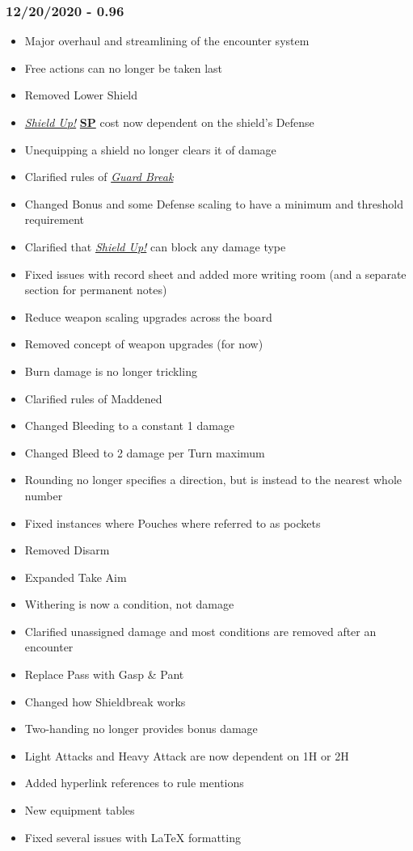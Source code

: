 \documentclass[12pt]{article}
\newcommand{\refto}[1]{\hyperlink{#1}{\textbf{#1}}}
\newcommand{\reftoit}[1]{\hyperlink{#1}{\emph{#1}}}
\begin{document}
\begin{multicols*}{2}
\subsubsection*{12/20/2020 - 0.96}
\begin{itemize}
\item Major overhaul and streamlining of the encounter system
\item Free actions can no longer be taken last
\item Removed Lower Shield
\item \reftoit{Shield Up!} \refto{SP} cost now dependent on the shield’s Defense
\item Unequipping a shield no longer clears it of damage
\item Clarified rules of \reftoit{Guard Break}
\item Changed Bonus and some Defense scaling to have a minimum and threshold requirement
\item Clarified that \reftoit{Shield Up!} can block any damage type
\item Fixed issues with record sheet and added more writing room  (and a separate section for permanent notes)
\item Reduce weapon scaling upgrades across the board
\item Removed concept of weapon upgrades (for now)
\item Burn damage is no longer trickling
\item Clarified rules of Maddened
\item Changed Bleeding to a constant 1 damage
\item Changed Bleed to 2 damage per Turn maximum
\item Rounding no longer specifies a direction, but is instead to the nearest whole number
\item Fixed instances where Pouches where referred to as pockets
\item Removed Disarm
\item Expanded Take Aim
\item Withering is now a condition, not damage
\item Clarified unassigned damage and most conditions are removed after an encounter
\item Replace Pass with Gasp \& Pant
\item Changed how Shieldbreak works
\item Two-handing no longer provides bonus damage
\item Light Attacks and Heavy Attack are now dependent on 1H or 2H
\item Added hyperlink references to rule mentions
\item New equipment tables
\item Fixed several issues with LaTeX formatting
\end{itemize}

\end{multicols*}
\end{document}
